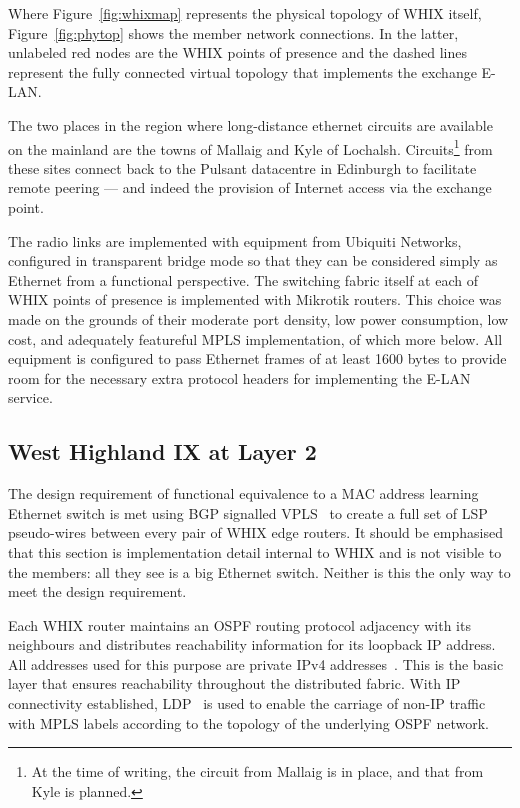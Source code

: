 Where Figure~\ref{fig:whixmap} represents the physical topology
of \ac{WHIX} itself, Figure~\ref{fig:phytop} shows the member network
connections. In the latter, unlabeled red nodes are the \ac{WHIX}
points of presence and the dashed lines represent the fully connected
virtual topology that implements the exchange E-LAN.

The two places in the region where long-distance ethernet circuits are
available on the mainland are the towns of Mallaig and Kyle of
Lochalsh. Circuits\footnote{At the time of writing, the circuit from
Mallaig is in place, and that from Kyle is planned.} from these sites
connect back to the Pulsant datacentre in Edinburgh to facilitate
remote peering --- and indeed the provision of Internet access via the
exchange point.

The radio links are implemented with equipment from Ubiquiti Networks,
configured in transparent bridge mode so that they can be considered
simply as Ethernet from a functional perspective. The switching fabric
itself at each of \ac{WHIX} points of presence is implemented with
Mikrotik routers. This choice was made on the grounds of their
moderate port density, low power consumption, low cost, and adequately
featureful \ac{MPLS} implementation, of which more below. All
equipment is configured to pass Ethernet frames of at least 1600 bytes
to provide room for the necessary extra protocol headers for
implementing the E-LAN service.

\subsection{West Highland IX at Layer 2}
\label{sec:bgpvpls}

The design requirement of functional equivalence to a \ac{MAC} address
learning Ethernet switch is met using \ac{BGP}
signalled \ac{VPLS}~\cite{rfc4761} to create a full set of \ac{LSP}
pseudo-wires between every pair of \ac{WHIX} edge routers. It should
be emphasised that this section is implementation detail internal
to \ac{WHIX} and is not visible to the members: all they see is a
big Ethernet switch. Neither is this the only way to meet the design
requirement. 

Each \ac{WHIX} router maintains an \ac{OSPF} routing protocol
adjacency with its neighbours and distributes reachability information
for its loopback IP address. All addresses used for this purpose are
private IPv4 addresses~\cite{rfc1918}. This is the basic layer that
ensures reachability throughout the distributed fabric. With IP
connectivity established, \ac{LDP}~\cite{rfc5036} is used to enable
the carriage of non-IP traffic with \ac{MPLS} labels according to the
topology of the underlying \ac{OSPF} network.

